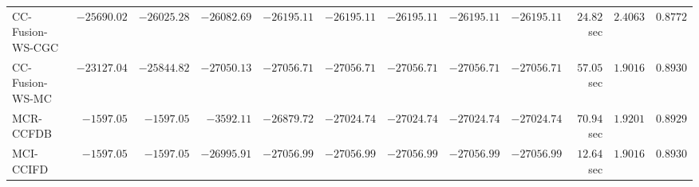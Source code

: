 \begin{table}[H]
\begin{tabular}{lrrrrrrrrrrr}
    CC-Fusion-WS-CGC & $    -25690.02$ & $    -26025.28$ & $    -26082.69$ & $    -26195.11$ & $    -26195.11$ & $    -26195.11$ & $    -26195.11$ & $    -26195.11$ & $        24.82$ sec    & $       2.4063$  & $       0.8772$ \\ 
     CC-Fusion-WS-MC & $    -23127.04$ & $    -25844.82$ & $    -27050.13$ & $    -27056.71$ & $    -27056.71$ & $    -27056.71$ & $    -27056.71$ & $    -27056.71$ & $        57.05$ sec    & $       1.9016$  & $       0.8930$ \\ 
\cmidrule{1-1} 
           MCR-CCFDB & $     -1597.05$ & $     -1597.05$ & $     -3592.11$ & $    -26879.72$ & $    -27024.74$ & $    -27024.74$ & $    -27024.74$ & $    -27024.74$ & $        70.94$ sec    & $       1.9201$  & $       0.8929$ \\ 
\cmidrule{1-1} 
           MCI-CCIFD & $     -1597.05$ & $     -1597.05$ & $    -26995.91$ & $    -27056.99$ & $    -27056.99$ & $    -27056.99$ & $    -27056.99$ & $    -27056.99$ & $        12.64$ sec    & $       1.9016$  & $       0.8930$ \\ 
\bottomrule
\end{tabular}
\end{table}

